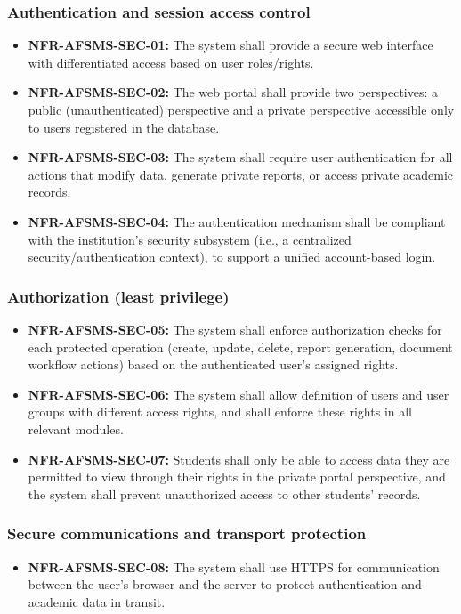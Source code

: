 \documentclass[11pt, a4paper]{article}
\begin{document}
\subsubsection{Authentication and session access control}
\begin{itemize}
    \item \textbf{NFR-AFSMS-SEC-01:} The system shall provide a secure web interface with differentiated access based on user roles/rights.
    \item \textbf{NFR-AFSMS-SEC-02:} The web portal shall provide two perspectives: a public (unauthenticated) perspective and a private perspective accessible only to users registered in the database.
    \item \textbf{NFR-AFSMS-SEC-03:} The system shall require user authentication for all actions that modify data, generate private reports, or access private academic records.
    \item \textbf{NFR-AFSMS-SEC-04:} The authentication mechanism shall be compliant with the institution's security subsystem (i.e., a centralized security/authentication context), to support a unified account-based login.
\end{itemize}

\subsubsection{Authorization (least privilege)}
\begin{itemize}
    \item \textbf{NFR-AFSMS-SEC-05:} The system shall enforce authorization checks for each protected operation (create, update, delete, report generation, document workflow actions) based on the authenticated user's assigned rights.
    \item \textbf{NFR-AFSMS-SEC-06:} The system shall allow definition of users and user groups with different access rights, and shall enforce these rights in all relevant modules.
    \item \textbf{NFR-AFSMS-SEC-07:} Students shall only be able to access data they are permitted to view through their rights in the private portal perspective, and the system shall prevent unauthorized access to other students' records.
\end{itemize}

\subsubsection{Secure communications and transport protection}
\begin{itemize}
    \item \textbf{NFR-AFSMS-SEC-08:} The system shall use HTTPS for communication between the user's browser and the server to protect authentication and academic data in transit.
\end{itemize}
\end{document}
